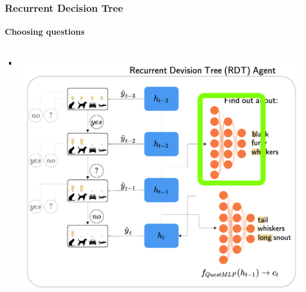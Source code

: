 \documentclass[9pt]{beamer}
\begin{document}
\begin{frame}
\frametitle{Recurrent Decision Tree}
\framesubtitle{Choosing questions}
\begin{columns}[T]
	\begin{column}{.5\textwidth}
		\begin{itemize}
			\item
		\end{itemize}
	\end{column}
	\begin{column}{.5\textwidth}
			\includegraphics[width=\textwidth]{images/urdtc_parts_questMLP.pdf}
	\end{column}
\end{columns}
\end{frame}
\end{document}
